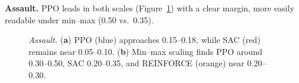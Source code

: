 \noindent \textbf{Assault.} PPO leads in both scales (Figure~\ref{fig:assault_combined}) with a clear margin, more easily readable under min--max (0.50 vs.\ 0.35).
\begin{figure} 
	\centering
	\quad
	\caption{\emph{Assault.}
		(\textbf{a}) PPO (blue) approaches 0.15--0.18, while SAC (red) remains near 0.05--0.10.
		(\textbf{b}) Min--max scaling finds PPO around 0.30--0.50, SAC 0.20--0.35, and REINFORCE (orange) near 0.20--0.30.}
	\label{fig:assault_combined}
\end{figure}

\medskip

